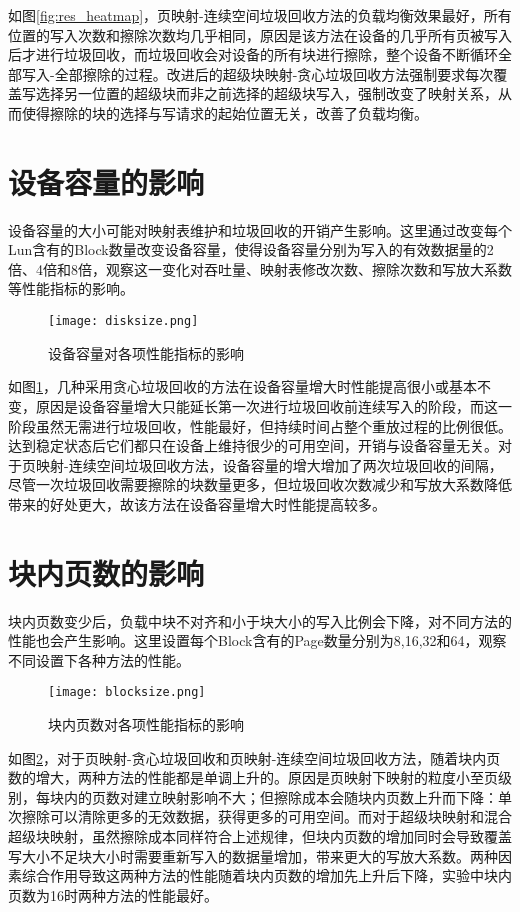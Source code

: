 如图\ref{fig:res_heatmap}，页映射-连续空间垃圾回收方法的负载均衡效果最好，所有位置的写入次数和擦除次数均几乎相同，原因是该方法在设备的几乎所有页被写入后才进行垃圾回收，而垃圾回收会对设备的所有块进行擦除，整个设备不断循环全部写入-全部擦除的过程。改进后的超级块映射-贪心垃圾回收方法强制要求每次覆盖写选择另一位置的超级块而非之前选择的超级块写入，强制改变了映射关系，从而使得擦除的块的选择与写请求的起始位置无关，改善了负载均衡。

\section{设备容量的影响}

设备容量的大小可能对映射表维护和垃圾回收的开销产生影响。这里通过改变每个Lun含有的Block数量改变设备容量，使得设备容量分别为写入的有效数据量的2倍、4倍和8倍，观察这一变化对吞吐量、映射表修改次数、擦除次数和写放大系数等性能指标的影响。

\begin{figure}[H]
    \centering
    \texttt{[image: disksize.png]}
    \caption{设备容量对各项性能指标的影响}
    \label{fig:res_disksize}
\end{figure}

如图\ref{fig:res_disksize}，几种采用贪心垃圾回收的方法在设备容量增大时性能提高很小或基本不变，原因是设备容量增大只能延长第一次进行垃圾回收前连续写入的阶段，而这一阶段虽然无需进行垃圾回收，性能最好，但持续时间占整个重放过程的比例很低。达到稳定状态后它们都只在设备上维持很少的可用空间，开销与设备容量无关。对于页映射-连续空间垃圾回收方法，设备容量的增大增加了两次垃圾回收的间隔，尽管一次垃圾回收需要擦除的块数量更多，但垃圾回收次数减少和写放大系数降低带来的好处更大，故该方法在设备容量增大时性能提高较多。

\section{块内页数的影响}

块内页数变少后，负载中块不对齐和小于块大小的写入比例会下降，对不同方法的性能也会产生影响。这里设置每个Block含有的Page数量分别为8,16,32和64，观察不同设置下各种方法的性能。

\begin{figure}[H]
    \centering
    \texttt{[image: blocksize.png]}
    \caption{块内页数对各项性能指标的影响}
    \label{fig:res_blocksize}
\end{figure}

如图\ref{fig:res_blocksize}，对于页映射-贪心垃圾回收和页映射-连续空间垃圾回收方法，随着块内页数的增大，两种方法的性能都是单调上升的。原因是页映射下映射的粒度小至页级别，每块内的页数对建立映射影响不大；但擦除成本会随块内页数上升而下降：单次擦除可以清除更多的无效数据，获得更多的可用空间。而对于超级块映射和混合超级块映射，虽然擦除成本同样符合上述规律，但块内页数的增加同时会导致覆盖写大小不足块大小时需要重新写入的数据量增加，带来更大的写放大系数。两种因素综合作用导致这两种方法的性能随着块内页数的增加先上升后下降，实验中块内页数为16时两种方法的性能最好。

